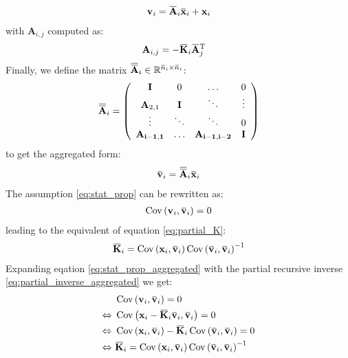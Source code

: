\documentclass[12pt]{scrartcl}
\newcommand{\overbar}[1]{\mkern 1.5mu\overline{\mkern-1.5mu#1\mkern-1.5mu}\mkern 1.5mu}
\DeclareMathOperator{\Cov}{Cov}
\begin{document}
\begin{align}
\label{eq:full_inverse_aggregated}
\mathbf{v}_i = \overbar{\mathbf{A}}_i \overbar{\mathbf{x}}_i + \mathbf{x}_i
\end{align}
with $\mathbf{A}_{i,j}$ computed as:
\begin{align}
\mathbf{A}_{i,j} & = - \overbar{\mathbf{K}}_i \overbar{\mathbf{A}}_j^\mathrm{T}
\end{align}
Finally, we define the matrix $\overbar{\overbar{\mathbf{A}}}_i \in \mathbb{R}^{\overbar{n}_i \times \overbar{n}_i}$:
\begin{align}
\overbar{\overbar{\mathbf{A}}}_i = \left(\begin{array}{cccc}
\mathbf{I} & 0 & \dots & 0 \\
\mathbf{A}_{2,1} & \mathbf{I} & \ddots & \vdots \\
\vdots & \ddots & \ddots & 0 \\
\mathbf{A_{i-1,1}} & \dots & \mathbf{A_{i-1,i-2}} & \mathbf{I}
\end{array}\right)
\end{align}
to get the aggregated form:
\begin{align}
\label{eq:aggregated}
\overbar{\mathbf{v}}_i = \overbar{\overbar{\mathbf{A}}}_i \overbar{\mathbf{x}}_i
\end{align}
$  $\\
The assumption \eqref{eq:stat_prop} can be rewritten as:
\begin{align}
\label{eq:stat_prop_aggregated}
\Cov\left(\mathbf{v}_i, \overbar{\mathbf{v}}_i\right) = 0
\end{align}
leading to the equivalent of equation \eqref{eq:partial_K}:
\begin{align}
\label{eq:partial_K_aggregated}
\overbar{\mathbf{K}}_i = \Cov\left(\mathbf{x}_i, \overbar{\mathbf{v}}_i\right) \Cov\left(\overbar{\mathbf{v}}_i, \overbar{\mathbf{v}}_i\right)^{-1}
\end{align}
Expanding eqation \eqref{eq:stat_prop_aggregated} with the partial recursive inverse \eqref{eq:partial_inverse_aggregated} we get:
\begin{align}
\label{eq:partial_K_aggregated}
& \Cov\left(\mathbf{v}_i, \overbar{\mathbf{v}}_i\right) = 0 \nonumber \\
\Leftrightarrow \ & \Cov\left(\mathbf{x}_i - \overbar{\mathbf{K}}_i \overbar{\mathbf{v}}_i, \overbar{\mathbf{v}}_i\right) = 0 \nonumber \\
\Leftrightarrow \ & \Cov\left(\mathbf{x}_i, \overbar{\mathbf{v}}_i\right) - \overbar{\mathbf{K}}_i \Cov\left(\overbar{\mathbf{v}}_i, \overbar{\mathbf{v}}_i\right) = 0 \nonumber \\
\Leftrightarrow \ & \overbar{\mathbf{K}}_i = \Cov\left(\mathbf{x}_i, \overbar{\mathbf{v}}_i\right) \Cov\left(\overbar{\mathbf{v}}_i, \overbar{\mathbf{v}}_i\right)^{-1}
\end{align}
\end{document}
